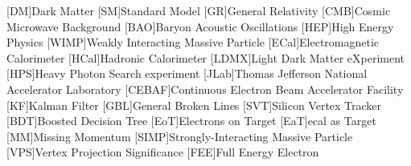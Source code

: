 
\usepackage{silence} %

\usepackage{epsfig} %
\usepackage{epic} %
\usepackage{eepic} %
\usepackage{url} %
\usepackage{longtable} %
\usepackage{mathrsfs} %
\usepackage{multirow} %
\usepackage{bigstrut} %
\usepackage{amssymb} %
\usepackage{graphicx} %
\usepackage{setspace} %
\usepackage{xspace} %
\usepackage{amsmath} %
\usepackage{siunitx} %
\usepackage{booktabs} %
\usepackage{hyperref} %
\usepackage{subcaption}
\usepackage{graphicx} %

\usepackage[noabbrev,capitalise]{cleveref} %

\newcommand{\creflastconjunction}{, and } %

\usepackage[compat=1.1.0]{tikz-feynman} %

\usepackage{hepunits}

\newcommand{\fourgev}{\qty{4}{GeV}\xspace}
\newcommand{\eightgev}{\qty{8}{GeV}\xspace}
\newcommand{\ecal}{ECal}
\newcommand{\hcal}{HCal}

\usepackage{acronym}
[DM]{Dark Matter}
[SM]{Standard Model}
[GR]{General Relativity}
[CMB]{Cosmic Microwave Background}
[BAO]{Baryon Acoustic Oscillations}
[HEP]{High Energy Physics}
[WIMP]{Weakly Interacting Massive Particle}
[ECal]{Electromagnetic Calorimeter}
[HCal]{Hadronic Calorimeter}
[LDMX]{Light Dark Matter eXperiment}
[HPS]{Heavy Photon Search experiment}
[JLab]{Thomas Jefferson National Accelerator Laboratory}
[CEBAF]{Continuous Electron Beam Accelerator Facility}
[KF]{Kalman Filter}
[GBL]{General Broken Lines}
[SVT]{Silicon Vertex Tracker}
[BDT]{Boosted Decision Tree}
[EoT]{Electrons on Target}
[EaT]{\ac{ecal} as Target}
[MM]{Missing Momentum}
[SIMP]{Strongly-Interacting Massive Particle}
[VPS]{Vertex Projection Significance}
[FEE]{Full Energy Electron}

